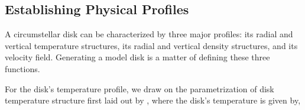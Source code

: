 \subsection{Establishing Physical Profiles}
\label{subsection:physical_profs}
A circumstellar disk can be characterized by three major profiles: its radial and vertical temperature structures, its radial and vertical density structures, and its velocity field. Generating a model disk is a matter of defining these three functions.







For the disk's temperature profile, we draw on the parametrization of disk temperature structure first laid out by \cite{Dartois2003}, where the disk's temperature is given by,

